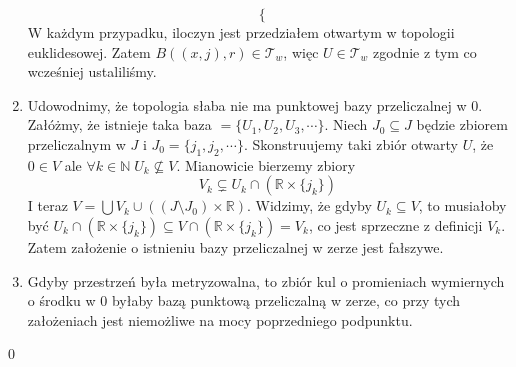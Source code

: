 \documentclass{article}
\theoremstyle{definition}%
\theoremstyle{theorem}
\renewenvironment{proof}{{\bfseries Rozwiązanie}}{\qed}
\newcommand{\R}{\mathbb{R}} %
\newcommand{\sT}{\mathcal{T}} %
\begin{document}
\begin{proof}
\begin{enumerate}
\[\begin{cases}
		 		\end{cases}
		 		\]
			 	W każdym przypadku, iloczyn jest przedziałem otwartym w topologii euklidesowej. Zatem $B((x,j),r) \in \sT_w$, więc $U\in \sT_w$ zgodnie z tym co wcześniej ustaliliśmy.
			 	\item 
		 		Udowodnimy, że topologia słaba nie ma punktowej bazy przeliczalnej w 0. \\
		 		Załóżmy, że istnieje taka baza $= \{U_1,U_2,U_3,\cdots\}$. Niech $J_0 \subseteq J$ będzie zbiorem przeliczalnym w $J$ i $J_0=\{j_1,j_2,\cdots\}$. Skonstruujemy taki zbiór otwarty $U$, że $0\in V$ ale $\forall k\in \mathbb{N} \; U_k \not\subseteq V$.
		 		Mianowicie bierzemy zbiory
		 		\[
		 		V_k \subsetneq U_k \cap \left(\R \times \{j_k\}\right)
		 		\]
		 		I teraz $V=\bigcup V_k \cup \left((J\setminus J_0)\times \R\right)$. Widzimy, że gdyby $U_k \subseteq V$, to musiałoby być $U_k\cap (\R \times \{j_k\}) \subseteq V \cap (\R \times \{j_k\}) = V_k$, co jest sprzeczne z definicji $V_k$. Zatem założenie o istnieniu bazy przeliczalnej w zerze jest fałszywe.
		 		\item
		 		Gdyby przestrzeń była metryzowalna, to zbiór kul o promieniach wymiernych o środku w 0 byłaby bazą punktową przeliczalną w zerze, co przy tych założeniach jest niemożliwe na mocy poprzedniego podpunktu.
		 	\end{enumerate}
		 	
		 \end{proof}
	
\end{document}
